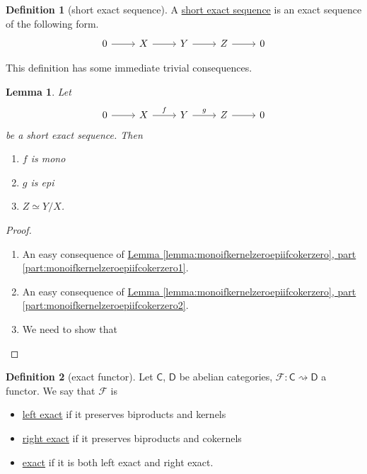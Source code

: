 \documentclass[a4paper,10pt]{scrreprt}
\newcommand{\defn}[1]{\ul{#1}}
\theoremstyle{definition}
\newtheorem{definition}{Definition}[section]
\theoremstyle{plain}
\newtheorem{lemma}{Lemma}[section]
\theoremstyle{remark}
\begin{document}
\begin{definition}[short exact sequence]
  \label{def:shortexactsequence}
  A \defn{short exact sequence} is an exact sequence of the following form.
  \begin{equation*}
    \begin{tikzcd}
      0
      \arrow[r]
      & X
      \arrow[r]
      & Y
      \arrow[r]
      & Z
      \arrow[r]
      & 0
    \end{tikzcd}
  \end{equation*}
\end{definition}

This definition has some immediate trivial consequences.
\begin{lemma}
  Let 
  \begin{equation*}
    \begin{tikzcd}
      0
      \arrow[r]
      & X
      \arrow[r, "f"]
      & Y
      \arrow[r, "g"]
      & Z
      \arrow[r]
      & 0
    \end{tikzcd}
  \end{equation*}
  be a short exact sequence. Then
  \begin{enumerate}
    \item $f$ is mono
    \item $g$ is epi
    \item $Z \simeq Y/X$.
  \end{enumerate}
\end{lemma}
\begin{proof}
  $\,$
  \begin{enumerate}
    \item An easy consequence of \hyperref[lemma:monoifkernelzeroepiifcokerzero]{Lemma \ref*{lemma:monoifkernelzeroepiifcokerzero}, part \ref*{part:monoifkernelzeroepiifcokerzero1}}.
    \item An easy consequence of \hyperref[lemma:monoifkernelzeroepiifcokerzero]{Lemma \ref*{lemma:monoifkernelzeroepiifcokerzero}, part \ref*{part:monoifkernelzeroepiifcokerzero2}}.
    \item We need to show that
  \end{enumerate}
\end{proof}

\begin{definition}[exact functor]
  \label{def:exactfunctor}
  Let $\mathsf{C}$, $\mathsf{D}$ be abelian categories, $\mathcal{F}\colon \mathsf{C} \rightsquigarrow \mathsf{D}$ a functor. We say that $\mathcal{F}$ is
  \begin{itemize}
    \item \defn{left exact} if it preserves biproducts and kernels
    \item \defn{right exact} if it preserves biproducts and cokernels
    \item \defn{exact} if it is both left exact and right exact.
  \end{itemize}
\end{definition}
\end{document}
